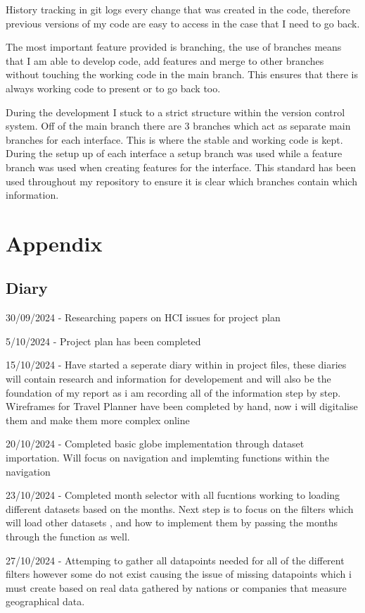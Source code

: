 \documentclass[]{project_interim}
\begin{document}
History tracking in git logs every change that was created in the code, therefore previous versions of my code are easy to access in the case that I need to go back.

The most important feature provided is branching, the use of branches means that I am able to develop code, add features and merge to other branches without touching the working code in the main branch. This ensures that there is always working code to present or to go back too.

During the development I stuck to a strict structure within the version control system. Off of the main branch there are 3 branches which act as separate main branches for each interface. This is where the stable and working code is kept. During the setup up of each interface a setup branch was used while a feature branch was used when creating features for the interface. This standard has been used throughout my repository to ensure it is clear which branches contain which information.

\chapter{Appendix}
\section{Diary}

30/09/2024 - Researching papers on HCI issues for project plan

5/10/2024 - Project plan has been completed

15/10/2024 - Have started a seperate diary within in project files, these diaries will contain research and information for developement and will also be the foundation of my report as i am recording all of the information step by step.
Wireframes for Travel Planner have been completed by hand, now i will digitalise them and make them more complex online

20/10/2024 - Completed basic globe implementation through dataset importation.
Will focus on navigation and implemting functions within the navigation

23/10/2024 - Completed month selector with all fucntions working to loading different datasets based on the months.
Next step is to focus on the filters which will load other datasets , and how to implement them by passing the months through the function as well.

27/10/2024 - Attemping to gather all datapoints needed for all of the different filters however some do not exist causing the issue of missing datapoints which i must create based on real data gathered by nations or companies that measure geographical data.
\end{document}
